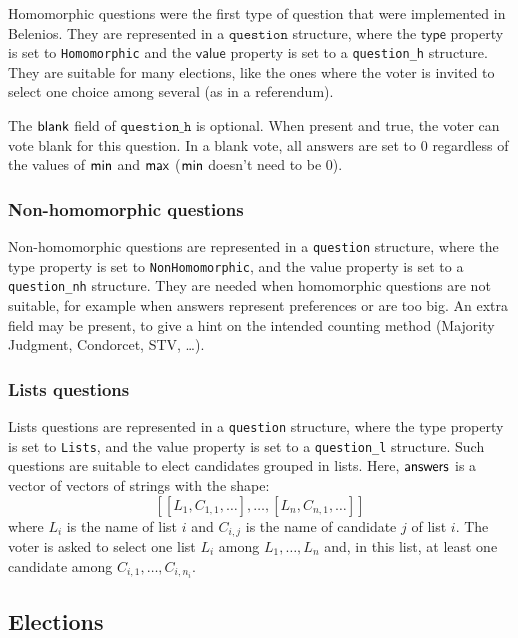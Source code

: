 \documentclass[a4paper]{article}
\begin{document}
Homomorphic questions were the first type of question that were
implemented in Belenios. They are represented in a $\texttt{question}$
structure, where the $\textsf{type}$ property is set to
\verb=Homomorphic= and the $\textsf{value}$ property is set to a
\texttt{question\_h} structure. They are suitable for many elections,
like the ones where the voter is invited to select one choice among
several (as in a referendum).

The $\textsf{blank}$ field of $\texttt{question\_h}$ is optional. When present
and true, the voter can vote blank for this question. In a blank vote,
all answers are set to $0$ regardless of the values of $\textsf{min}$ and
$\textsf{max}$ ($\textsf{min}$ doesn't need to be $0$).

\subsubsection{Non-homomorphic questions}

Non-homomorphic questions are represented in a \texttt{question}
structure, where the \textsf{type} property is set to
\verb=NonHomomorphic=, and the \textsf{value} property is set to a
\texttt{question\_nh} structure. They are needed when homomorphic
questions are not suitable, for example when answers represent
preferences or are too big. An \textsf{extra} field may be present, to
give a hint on the intended counting method (Majority Judgment,
Condorcet, STV, \dots).

\subsubsection{Lists questions}

Lists questions are represented in a \texttt{question} structure,
where the \textsf{type} property is set to \verb=Lists=, and the
\textsf{value} property is set to a \texttt{question\_l}
structure. Such questions are suitable to elect candidates grouped in
lists. Here, $\textsf{answers}$ is a vector of vectors of strings with the
shape:
\[ [[L_1,C_{1,1},\dots],\dots,[L_n,C_{n,1},\dots]] \] where $L_i$ is
the name of list $i$ and $C_{i,j}$ is the name of candidate $j$ of
list $i$. The voter is asked to select one list $L_i$ among
$L_1,\dots,L_n$ and, in this list, at least one candidate among
$C_{i,1},\dots,C_{i,n_i}$.

\subsection{Elections}
\label{elections}
\end{document}

